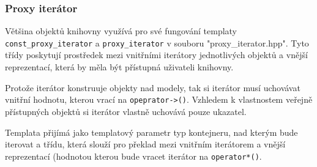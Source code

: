 \documentclass[12pt,a4paper,titlepage]{scrartcl}
\begin{document}
	\subsubsection{Proxy iterátor}
	Většina objektů knihovny využívá pro své fungování templaty \texttt{const\_proxy\_iterator} a \texttt{proxy\_iterator} v souboru "proxy\_iterator.hpp". Tyto třídy poskytují prostředek mezi vnitřními iterátory jednotlivých objektů a vnější reprezentací, která by měla být přístupná uživateli knihovny. 
	\par
	Protože iterátor konstruuje objekty nad modely, tak si iterátor musí uchovávat vnitřní hodnotu, kterou vrací na \texttt{opeprator->()}. Vzhledem k vlastnostem veřejně přístupných objektů si iterátor vlastně uchovává pouze ukazatel.
	\par
	Templata přijímá jako templatový parametr typ kontejneru, nad kterým bude iterovat a třídu, která slouží pro překlad mezi vnitřním iterátorem a vnější reprezentací (hodnotou kterou bude vracet iterátor na \texttt{operator*()}.
	
\end{document}
